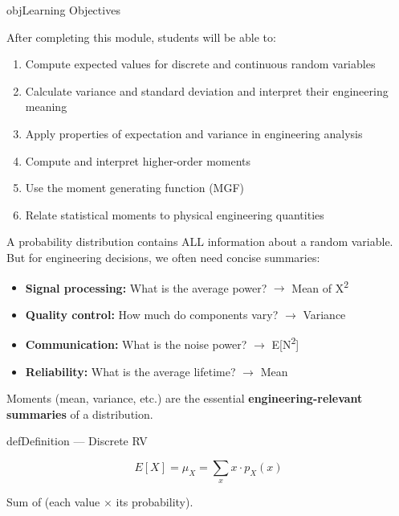 \begin{PSbox}[unbreakable]{obj}{Learning Objectives}

After completing this module, students will be able to:

\begin{enumerate}
\def\labelenumi{\arabic{enumi}.}
\tightlist
\item
  Compute expected values for discrete and continuous random variables
\item
  Calculate variance and standard deviation and interpret their engineering meaning
\item
  Apply properties of expectation and variance in engineering analysis
\item
  Compute and interpret higher-order moments
\item
  Use the moment generating function (MGF)
\item
  Relate statistical moments to physical engineering quantities
\end{enumerate}

\end{PSbox}



A probability distribution contains ALL information about a random variable. But for engineering decisions, we often need concise summaries:

\begin{itemize}
\tightlist
\item
  \textbf{Signal processing:} What is the average power? \ensuremath{\to} Mean of X\textsuperscript{2}
\item
  \textbf{Quality control:} How much do components vary? \ensuremath{\to} Variance
\item
  \textbf{Communication:} What is the noise power? \ensuremath{\to} E[N\textsuperscript{2}]
\item
  \textbf{Reliability:} What is the average lifetime? \ensuremath{\to} Mean
\end{itemize}

Moments (mean, variance, etc.) are the essential \textbf{engineering-relevant summaries} of a distribution.


\begin{PSbox}[unbreakable]{def}{Definition — Discrete RV}

\[E[X] = \mu_X = \sum_{x} x \cdot p_X(x)\]

Sum of (each value \ensuremath{\times} its probability).

\end{PSbox}

